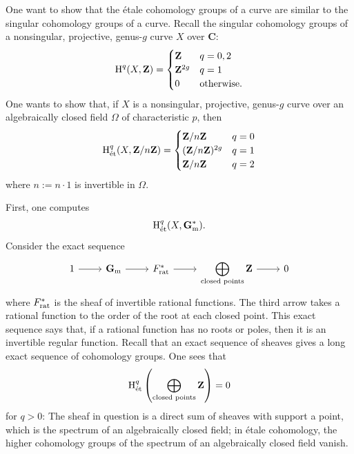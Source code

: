 \documentclass [11 pt, oneside] {article}
\begin{document}
One want to show that the \'etale cohomology groups of a curve are similar to the singular cohomology groups of a curve. 
Recall the singular cohomology groups of a nonsingular, projective, genus-$g$ curve $X$ over $\mathbf{C}$:
\begin{align*}
	\operatorname{H}^{q}(X,\mathbf{Z}) =
	\begin{cases}
		\mathbf{Z} & q = 0,2\\
		\mathbf{Z}^{2g} & q=1\\
		0&\textrm{otherwise.}
	\end{cases}
\end{align*}
One wants to show that, if $X$ is a nonsingular, projective, genus-$g$ curve over an algebraically closed field $\Omega$ of characteristic $p$, then
\begin{align*}
	\operatorname{H}_{\textup {\'et}}^{q} (X,\mathbf{Z}/n\mathbf{Z}) =
	\begin{cases}
		\mathbf{Z}/n\mathbf{Z} & q=0\\
		(\mathbf{Z}/n\mathbf{Z}) ^{2g}& q=1\\
		\mathbf{Z}/n\mathbf{Z}&q=2
	\end{cases}
\end{align*}
where $n := n\cdot 1$ is invertible in $\Omega$. 

First, one computes
\begin{align*}
	\operatorname{H}_{\textup {\'et}}^{q}(X, \mathbf{G}_{\textup {m}}^{*}).
\end{align*}
Consider the exact sequence
\[
\begin{tikzcd}
	1\ar[r] & \mathbf{G}\sub{m}\ar[r] & \mathscr{F}\sub{rat}^{*}\ar[r] & \displaystyle \bigoplus_{\textrm{closed points}} \mathbf{Z}\ar[r] &0
\end{tikzcd}
\]
where $\relax{F}_{\textup {rat}}^{*}$ is the sheaf of invertible rational functions.
The third arrow takes a rational function to the order of the root at each closed point.
This exact sequence says that, if a rational function has no roots or poles, then it is an invertible regular function.
Recall that an exact sequence of sheaves gives a long exact sequence of cohomology groups.
One sees that
\begin{align*}
	\operatorname{H}_{\textup {\'et}}^{q}\left(\bigoplus_{\textrm{closed points}} \mathbf{Z} \right) =0  
\end{align*}
for $q>0$: The sheaf in question is a direct sum of sheaves with support a point, which is the spectrum of an algebraically closed field; in \'etale cohomology, the higher cohomology groups of the spectrum of an algebraically closed field vanish.
\end{document}
